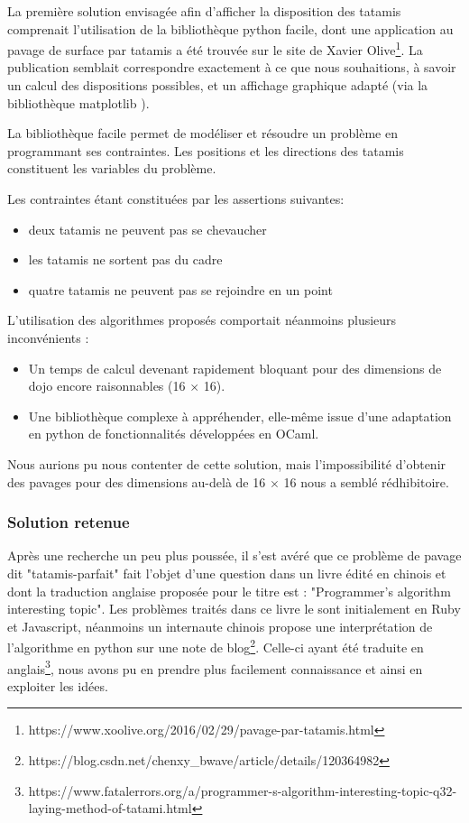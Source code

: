 La première solution envisagée afin d’afficher la disposition des tatamis comprenait l’utilisation
de la bibliothèque python facile, dont une application au pavage de surface par tatamis a été trouvée
sur le site de Xavier Olive\footnote{https://www.xoolive.org/2016/02/29/pavage-par-tatamis.html}.  La publication semblait correspondre exactement à ce que nous souhaitions,
à savoir un calcul des dispositions possibles, et un affichage graphique adapté (via la bibliothèque matplotlib ).

La bibliothèque facile permet de modéliser et résoudre un problème en programmant ses contraintes.
Les positions et les directions des tatamis constituent les variables du problème.

Les contraintes étant constituées par les assertions suivantes:

\begin{itemize}
    \item deux tatamis ne peuvent pas se chevaucher
    \item les tatamis ne sortent pas du cadre
    \item quatre tatamis ne peuvent pas se rejoindre en un point
\end{itemize}

L’utilisation des algorithmes proposés comportait néanmoins plusieurs inconvénients :

\begin{itemize}
    \item Un temps de calcul devenant rapidement bloquant pour des dimensions de dojo encore raisonnables (16 $\times$ 16).
    \item Une bibliothèque complexe à appréhender, elle-même issue d’une adaptation en python
          de fonctionnalités développées en OCaml.
\end{itemize}

Nous aurions pu nous contenter de cette solution, mais l’impossibilité d’obtenir des pavages
pour des dimensions au-delà de 16 $\times$ 16 nous a semblé rédhibitoire.

\subsubsection{Solution retenue}

Après une recherche un peu plus poussée, il s'est avéré que ce problème de pavage dit "tatamis-parfait"
fait l'objet d'une question dans un livre édité en chinois et dont la traduction anglaise proposée pour le titre
est : "Programmer's algorithm interesting topic". Les problèmes traités dans ce livre le sont initialement en Ruby et Javascript,
néanmoins un internaute chinois propose une interprétation de l'algorithme en python sur une note de
blog\footnote{https://blog.csdn.net/chenxy\_bwave/article/details/120364982}.
Celle-ci ayant été traduite en anglais\footnote{https://www.fatalerrors.org/a/programmer-s-algorithm-interesting-topic-q32-laying-method-of-tatami.html},
nous avons pu en prendre plus facilement connaissance et ainsi en exploiter les idées.\\

